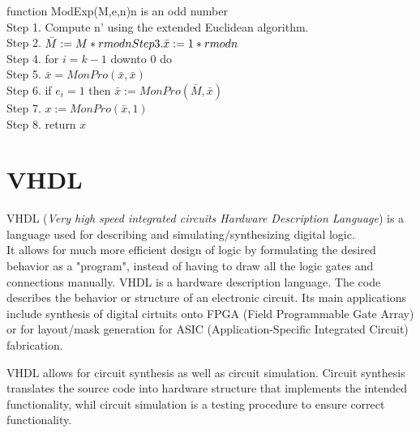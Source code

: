 \begin{algorithm}
function ModExp(M,e,n){n is an odd number}\\
Step 1. Compute n' using the extended Euclidean algorithm.\\
Step 2. $\bar{M} := M* r mod n\\
Step 3. \bar{x}:= 1* r mod n$\\
Step 4. for $i=k-1$ downto $0$ do\\
Step 5. \quad $\bar{x}= MonPro(\bar{x},\bar{x})$\\
Step 6. \quad if $e_i =1$ then $\bar{x}:= MonPro(\bar{M}, \bar{x})$\\
Step 7. $x:= MonPro(\bar{x},1)$\\
Step 8. return $x$\\
\end{algorithm}

\section{VHDL}
VHDL (\emph{Very high speed integrated circuits Hardware Description Language}) is a language used for describing and simulating/synthesizing digital logic.\\
It allows for much more efficient design of logic by formulating the desired behavior as a "program", instead of having to draw all the logic gates and connections manually.
VHDL is a hardware description language. The code describes the behavior or structure of an electronic circuit\cite{pedroni}. Its main applications include synthesis of digital cirtuits onto FPGA (Field Programmable Gate Array) or for layout/mask generation for ASIC (Application-Specific Integrated Circuit) fabrication.

VHDL allows for circuit synthesis as well as circuit simulation. Circuit synthesis translates the source code into hardware structure that implements the intended functionality, whil circuit simulation is a testing procedure to ensure correct functionality. 
